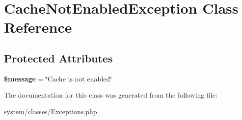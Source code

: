 \hypertarget{class_cache_not_enabled_exception}{
\section{CacheNotEnabledException Class Reference}
\label{class_cache_not_enabled_exception}
}
\subsection*{Protected Attributes}
\begin{DoxyCompactItemize}
\item 
\hypertarget{class_cache_not_enabled_exception_abf17cb2dba2ed17cb28aa5f37deb5293}{
{\bfseries \$message} = \char`\"{}Cache is not enabled\char`\"{}}
\label{class_cache_not_enabled_exception_abf17cb2dba2ed17cb28aa5f37deb5293}

\end{DoxyCompactItemize}


The documentation for this class was generated from the following file:\begin{DoxyCompactItemize}
\item 
system/classes/Exceptions.php\end{DoxyCompactItemize}
